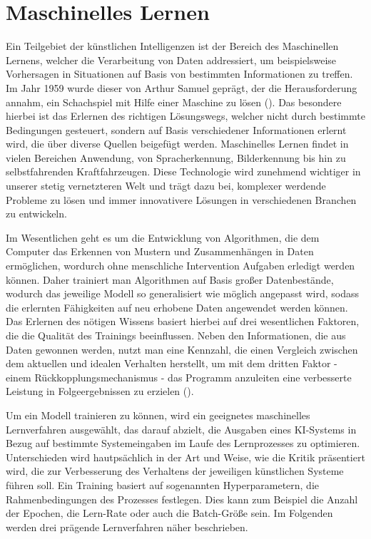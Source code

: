 \section{Maschinelles Lernen} \label{chpt:Stand_der_Technik_Maschinelles_Lernen}
Ein Teilgebiet der künstlichen Intelligenzen ist der Bereich des Maschinellen Lernens, welcher die Verarbeitung von Daten addressiert, um beispielsweise Vorhersagen in Situationen auf Basis von bestimmten Informationen zu treffen.
Im Jahr 1959 wurde dieser von Arthur Samuel geprägt, der die Herausforderung annahm, ein Schachspiel mit Hilfe einer Maschine zu lösen (\cite[4]{joshi_machine_2020}).
Das besondere hierbei ist das Erlernen des richtigen Lösungswegs, welcher nicht durch bestimmte Bedingungen gesteuert, sondern auf Basis verschiedener Informationen erlernt wird, die über diverse Quellen beigefügt werden.
Maschinelles Lernen findet in vielen Bereichen Anwendung, von Spracherkennung, Bilderkennung bis hin zu selbstfahrenden Kraftfahrzeugen. Diese Technologie wird zunehmend wichtiger in unserer stetig vernetzteren Welt und trägt dazu bei, komplexer werdende Probleme zu lösen und immer innovativere Lösungen in verschiedenen Branchen zu entwickeln.

Im Wesentlichen geht es um die Entwicklung von Algorithmen, die dem Computer das Erkennen von Mustern und Zusammenhängen in Daten ermöglichen, wordurch ohne menschliche Intervention Aufgaben erledigt werden können.
Daher trainiert man Algorithmen auf Basis großer Datenbestände, wodurch das jeweilige Modell so generalisiert wie möglich angepasst wird, sodass die erlernten Fähigkeiten auf neu erhobene Daten angewendet werden können. Das Erlernen des nötigen Wissens basiert hierbei auf drei wesentlichen Faktoren, die die Qualität des Trainings beeinflussen. Neben den Informationen, die aus Daten gewonnen werden, nutzt man eine Kennzahl, die einen Vergleich zwischen dem aktuellen und idealen Verhalten herstellt, um mit dem dritten Faktor - einem Rückkopplungsmechanismus - das Programm anzuleiten eine verbesserte Leistung in Folgeergebnissen zu erzielen (\cite[4]{joshi_machine_2020}).

Um ein Modell trainieren zu können, wird ein geeignetes maschinelles Lernverfahren ausgewählt, das darauf abzielt, die Ausgaben eines KI-Systems in Bezug auf bestimmte Systemeingaben im Laufe des Lernprozesses zu optimieren. Unterschieden wird hautpsächlich in der Art und Weise, wie die \glqq Kritik\grqq{} präsentiert wird, die zur Verbesserung des Verhaltens der jeweiligen künstlichen Systeme führen soll. Ein Training basiert auf sogenannten Hyperparametern, die Rahmenbedingungen des Prozesses festlegen. Dies kann zum Beispiel die Anzahl der Epochen, die Lern-Rate oder auch die Batch-Größe sein. Im Folgenden werden drei prägende Lernverfahren näher beschrieben.
